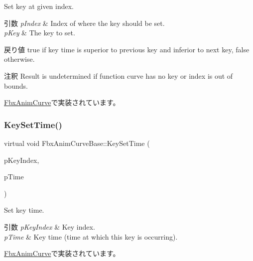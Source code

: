 Set key at given index. 
\begin{DoxyParams}{引数}
{\em p\+Index} & Index of where the key should be set. \\
\hline
{\em p\+Key} & The key to set. \\
\hline
\end{DoxyParams}
\begin{DoxyReturn}{戻り値}
{\ttfamily true} if key time is superior to previous key and inferior to next key, {\ttfamily false} otherwise. 
\end{DoxyReturn}
\begin{DoxyRemark}{注釈}
Result is undetermined if function curve has no key or index is out of bounds. 
\end{DoxyRemark}


\hyperlink{class_fbx_anim_curve_a8f36f89bd5fbaa4f180789f4d9faf84f}{Fbx\+Anim\+Curve}で実装されています。

\mbox{\label{class_fbx_anim_curve_base_afce0ede7336b9639c1e7ac08adf3e6df}} 
\subsubsection{\texorpdfstring{Key\+Set\+Time()}{KeySetTime()}}
{\footnotesize\ttfamily virtual void Fbx\+Anim\+Curve\+Base\+::\+Key\+Set\+Time (\begin{DoxyParamCaption}\item[{int}]{p\+Key\+Index,  }\item[{\hyperlink{class_fbx_time}{Fbx\+Time}}]{p\+Time }\end{DoxyParamCaption})\hspace{0.3cm}{\ttfamily [pure virtual]}}

Set key time. 
\begin{DoxyParams}{引数}
{\em p\+Key\+Index} & Key index. \\
\hline
{\em p\+Time} & Key time (time at which this key is occurring). \\
\hline
\end{DoxyParams}


\hyperlink{class_fbx_anim_curve_a5ce2130d0cea4de2fc42fa3683f01162}{Fbx\+Anim\+Curve}で実装されています。

\mbox{\label{class_fbx_anim_curve_base_a58ba1ce28a08145795d95bb27e2db02f}} 
